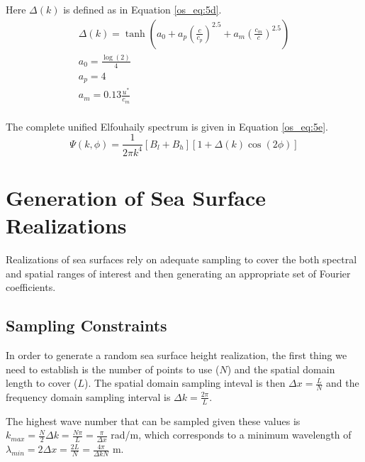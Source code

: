 Here $\Delta(k)$ is defined as in Equation \ref{os_eq:5d}.
\begin{equation}
\label{os_eq:5d}
\begin{gathered}
\Delta(k) = \tanh\left( a_0 + a_p\left(\frac{c}{c_p}\right)^{2.5}  + a_m\left(\frac{c_m}{c} \right)^{2.5}\right)\\
a_0 = \frac{\log(2)}{4} \\
a_p = 4\\
a_m = 0.13\frac{u^*}{c_m} \\
\end{gathered}
\end{equation}
\renewcommand{\baselinestretch}{2} \small\normalsize

The complete unified Elfouhaily spectrum is given in Equation \ref{os_eq:5e}.
\begin{equation}
\label{os_eq:5e}
\boxed{\Psi(k,\phi) = \frac{1}{2\pi k^4}\left[B_l + B_h \right] \left[1 + \Delta(k)\cos(2\phi) \right]}
\end{equation}

\section{Generation of Sea Surface Realizations}
Realizations of sea surfaces rely on adequate sampling to cover the both spectral and spatial ranges of interest and then generating an appropriate set of Fourier coefficients.

\subsection{Sampling Constraints}
In order to generate a random sea surface height realization,  the first thing we need to establish is the number of points to use ($N$) and the spatial domain length to cover ($L$). The spatial domain sampling inteval is then $\Delta x = \frac{L}{N}$ and the frequency domain sampling interval is $\Delta k = \frac{2\pi}{L}$.

The highest wave number that can be sampled given these values is $k_{max} = \frac{N}{2}\Delta k = \frac{N\pi}{L} = \frac{\pi}{\Delta x}$ rad/m, which corresponds to a minimum wavelength of $\lambda_{min} = 2\Delta x = \frac{2L}{N} = \frac{4\pi}{\Delta k N}$ m.

